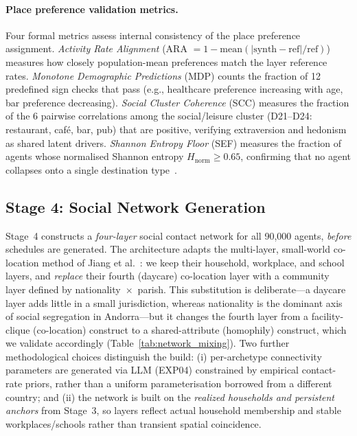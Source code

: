 \documentclass[a4paper,12pt]{article}
\begin{document}
\paragraph{Place preference validation metrics.}
Four formal metrics assess internal consistency of the place preference
assignment. \emph{Activity Rate Alignment} (ARA $= 1 - \mathrm{mean}(
|\mathrm{synth} - \mathrm{ref}|/\mathrm{ref})$) measures how closely
population-mean preferences match the layer reference rates. \emph{Monotone
Demographic Predictions} (MDP) counts the fraction of 12 predefined sign
checks that pass (e.g., healthcare preference increasing with age, bar
preference decreasing). \emph{Social Cluster Coherence} (SCC) measures
the fraction of the 6 pairwise correlations among the social/leisure
cluster (D21--D24: restaurant, caf\'e, bar, pub) that are positive,
verifying extraversion and hedonism as shared latent drivers.
\emph{Shannon Entropy Floor} (SEF) measures the fraction of agents whose
normalised Shannon entropy $H_\mathrm{norm} \geq 0.65$, confirming that
no agent collapses onto a single destination type~\cite{shannon1948mathematical}.

\subsection{Stage 4: Social Network Generation}
\label{subsec:social_network}

Stage~4 constructs a \emph{four-layer} social contact network for all 90,000 agents,
\emph{before} schedules are generated. The architecture adapts the multi-layer,
small-world co-location method of Jiang et al.~\cite{jiang2022synthetic}: we keep
their household, workplace, and school layers, and \emph{replace} their fourth
(daycare) co-location layer with a community layer defined by
nationality~$\times$~parish. This substitution is deliberate---a daycare layer adds
little in a small jurisdiction, whereas nationality is the dominant axis of social
segregation in Andorra---but it changes the fourth layer from a facility-clique
(co-location) construct to a shared-attribute (homophily) construct, which we
validate accordingly (Table~\ref{tab:network_mixing}). Two further methodological
choices distinguish the build: (i) per-archetype connectivity parameters are
generated via LLM (EXP04) constrained by empirical contact-rate priors, rather than a
uniform parameterisation borrowed from a different country; and (ii) the network is
built on the \emph{realized households and persistent anchors} from Stage~3, so layers
reflect actual household membership and stable workplaces/schools rather than transient
spatial coincidence.
\end{document}
